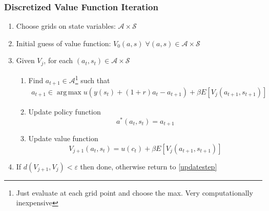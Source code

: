 \documentclass[10pt]{beamer}
\DeclareMathOperator*{\argmax}{arg\,max}
\begin{document}
\begin{frame} \frametitle{Discretized Value Function Iteration}

  \begin{enumerate}
    \item Choose grids on state variables: $\mathcal{A} \times \mathcal{S}$
    \item Initial guess of value function: $V_0(a, s) \;\forall (a, s) \in \mathcal{A} \times \mathcal{S}$
    \item Given $V_j$, for each $(a_t, s_t) \in \mathcal{A} \times \mathcal{S}$ \label{updatestep}
      \begin{enumerate}
        \item Find $a_{t+1} \in \mathcal{A}$\footnote{Just evaluate at each grid point and choose the max. Very computationally inexpensive} such that
          \begin{align*}
            a_{t+1} \in \argmax u(y(s_t) + (1+r) a_t - a_{t+1}) + \beta E \left[ V_j(a_{t+1}, s_{t+1}) \right]
          \end{align*}
        \item Update policy function $$a^*(a_t, s_t) = a_{t+1}$$
        \item Update value function $$V_{j+1}(a_t, s_t) = u(c_t) + \beta E \left[V_{j}(a_{t+1}, s_{t+1}) \right]$$
      \end{enumerate}
    \item If $d(V_{j+1}, V_j) < \varepsilon$ then done, otherwise return to \ref{updatestep}
  \end{enumerate}

\end{frame}
\end{document}
